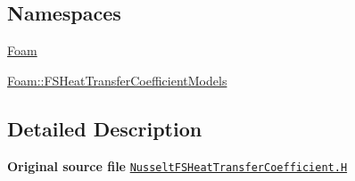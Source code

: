 \subsection*{Namespaces}
\begin{DoxyCompactItemize}
\item 
 \hyperlink{namespaceFoam}{Foam}
\item 
 \hyperlink{namespaceFoam_1_1FSHeatTransferCoefficientModels}{Foam\+::\+F\+S\+Heat\+Transfer\+Coefficient\+Models}
\end{DoxyCompactItemize}


\subsection{Detailed Description}
{\bfseries Original source file} \href{../../../home/carlo/data/GeN-Foam/GeN-Foam_ffn/GeN-Foam/GeN-Foam/classes/thermalHydraulics/src/physicsModels/heatTransferModels/FSHeatTransferCoefficientModels/Nusselt/NusseltFSHeatTransferCoefficient.H}{\tt Nusselt\+F\+S\+Heat\+Transfer\+Coefficient.\+H} 
